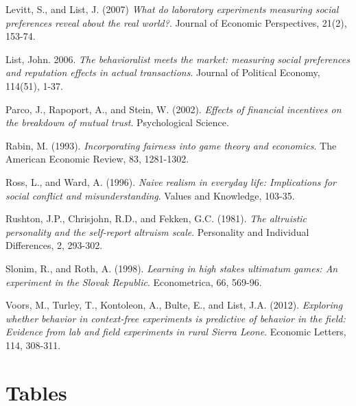 \documentclass[12pt]{article}
\begin{document}
\begin{thebibliography}{9}
Levitt, S., and List, J. (2007)
\textit{What do laboratory experiments measuring social preferences reveal about the real world?}.
Journal of Economic Perspectives, 21(2), 153-74.


List, John. 2006.
\textit{The behavioralist meets the market: measuring social preferences and reputation effects in actual transactions}.
Journal of Political Economy, 114(51), 1-37.


Parco, J., Rapoport, A., and Stein, W. (2002).
\textit{Effects of financial incentives on the breakdown of mutual trust}.
Psychological Science.

Rabin, M. (1993).
\textit{Incorporating fairness into game theory and economics}.
The American Economic Review, 83, 1281-1302.

Ross, L., and Ward, A. (1996).
\textit{Naive realism in everyday life: Implications for social conflict and misunderstanding}.
Values and Knowledge, 103-35.

Rushton, J.P., Chrisjohn, R.D., and Fekken, G.C. (1981).
\textit{The altruistic personality and the self-report altruism scale}.
Personality and Individual Differences, 2, 293-302.

Slonim, R., and Roth, A. (1998).
\textit{Learning in high stakes ultimatum games: An experiment in the Slovak Republic}.
Econometrica, 66, 569-96.


Voors, M., Turley, T., Kontoleon, A., Bulte, E., and List, J.A. (2012).
\textit{Exploring whether behavior in context-free experiments is predictive of behavior in the field: Evidence from lab and field experiments in rural Sierra Leone}.
Economic Letters, 114, 308-311.


\end{thebibliography}

\appendix
\section{Tables}
\end{document}
